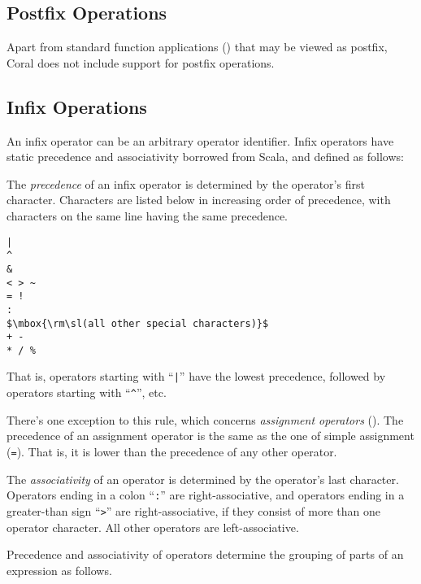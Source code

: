 \subsection{Postfix Operations}

Apart from standard function applications () that may be viewed as postfix, Coral does not include support for postfix operations. 





\subsection{Infix Operations}
\label{sec:infix-operations}

An infix operator can be an arbitrary operator identifier. Infix operators have static precedence and associativity borrowed from Scala, and defined as follows:

The {\em precedence} of an infix operator is determined by the operator's first character. Characters are listed below in increasing order of precedence, with characters on the same line having the same precedence.

\begin{lstlisting}
|
^
&
< > ~
= !
:
$\mbox{\rm\sl(all other special characters)}$
+ -
* / %
\end{lstlisting}

That is, operators starting with ``\lstinline!|!'' have the lowest precedence, followed by operators starting with ``\lstinline!^!'', etc. 

There's one exception to this rule, which concerns {\em assignment operators} (). The precedence of an assignment operator is the same as the one of simple assignment (\lstinline!=!). That is, it is lower than the precedence of any other operator. 

The {\em associativity} of an operator is determined by the operator's last character. Operators ending in a colon ``\lstinline!:!'' are right-associative, and operators ending in a greater-than sign ``\lstinline!>!'' are right-associative, if they consist of more than one operator character. All other operators are left-associative. 

Precedence and associativity of operators determine the grouping of parts of an expression as follows.


